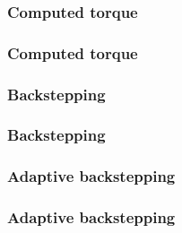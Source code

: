 \subsubsection{Computed torque}
\begin{frame}
\frametitle{Computed torque}
\end{frame}
%
\subsubsection{Backstepping}
\begin{frame}
\frametitle{Backstepping}
\end{frame}
%
\subsubsection{Adaptive backstepping}
\begin{frame}
\frametitle{Adaptive backstepping}
\end{frame}